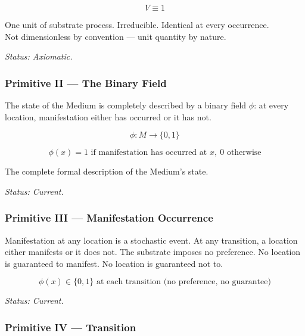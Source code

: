 \documentclass[11pt,letterpaper]{article}
\begin{document}
\begin{equation}
V \equiv 1
\end{equation}

\begin{center}
One unit of substrate process. Irreducible. Identical at every occurrence.\\
Not dimensionless by convention --- unit quantity by nature.
\end{center}

\emph{Status: Axiomatic.}
\subsubsection{Primitive II --- The Binary Field}
\label{sec:org6c34960}

The state of the Medium is completely described by a binary field \(\phi\): at every location, manifestation either has occurred or it has not.

\begin{equation}
\phi : M \to \{0, 1\}
\end{equation}

\begin{equation}
\phi(x) = 1 \text{ if manifestation has occurred at } x,\ 0 \text{ otherwise}
\end{equation}

\begin{center}
The complete formal description of the Medium's state.
\end{center}

\emph{Status: Current.}
\subsubsection{Primitive III --- Manifestation Occurrence}
\label{sec:orgb618886}

Manifestation at any location is a stochastic event. At any transition, a location either manifests or it does not. The substrate imposes no preference. No location is guaranteed to manifest. No location is guaranteed not to.

\begin{equation}
\phi(x) \in \{0, 1\} \text{ at each transition (no preference, no guarantee)}
\end{equation}

\emph{Status: Current.}
\subsubsection{Primitive IV --- Transition}
\label{sec:org32678b9}
\end{document}
